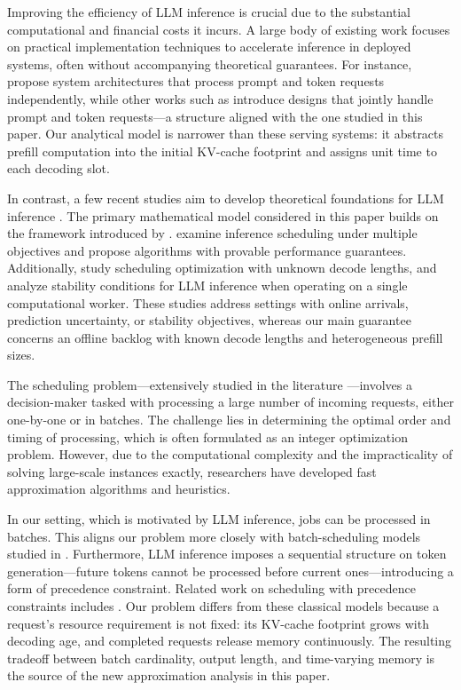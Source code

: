 \documentclass[nonblindrev]{informs3_hide}
\newcommand{\xhdr}[1]{\vspace{1mm} \noindent{\bf #1}}
\begin{document}
\xhdr{LLM Inference. } Improving the efficiency of LLM inference is crucial due to the substantial computational and financial costs it incurs. A large body of existing work focuses on practical implementation techniques to accelerate inference in deployed systems, often without accompanying theoretical guarantees. For instance, \citet{patel2023splitwise} propose system architectures that process prompt and token requests independently, while other works such as \citet{yu2022orca, agrawal2023sarathi, agrawal2024taming} introduce designs that jointly handle prompt and token requests---a structure aligned with the one studied in this paper. Our analytical model is narrower than these serving systems: it abstracts prefill computation into the initial KV-cache footprint and assigns unit time to each decoding slot.

In contrast, a few recent studies aim to develop theoretical foundations for LLM inference \cite{zhou2026position}. The primary mathematical model considered in this paper builds on the framework introduced by \citet{jaillet2025online}. \citet{ao2025optimizing} examine inference scheduling under multiple objectives and propose algorithms with provable performance guarantees. Additionally, \citet{chen2025adaptively,chen2026universal,bu2026tackling} study scheduling optimization with unknown decode lengths, and \citet{nie2026queueing} analyze stability conditions for LLM inference when operating on a single computational worker. These studies address settings with online arrivals, prediction uncertainty, or stability objectives, whereas our main guarantee concerns an offline backlog with known decode lengths and heterogeneous prefill sizes.

\xhdr{Scheduling. } The scheduling problem---extensively studied in the literature \citep{allahverdi2008survey, chen1998review, brucker1999resource, albers2009online}---involves a decision-maker tasked with processing a large number of incoming requests, either one-by-one or in batches. The challenge lies in determining the optimal order and timing of processing, which is often formulated as an integer optimization problem. However, due to the computational complexity and the impracticality of solving large-scale instances exactly, researchers have developed fast approximation algorithms and heuristics.

In our setting, which is motivated by LLM inference, jobs can be processed in batches. This aligns our problem more closely with batch-scheduling models studied in \citep{brucker1998scheduling, chen2008logistics, li2020online}. Furthermore, LLM inference imposes a sequential structure on token generation---future tokens cannot be processed before current ones---introducing a form of precedence constraint. Related work on scheduling with precedence constraints includes \citep{shahout2024don, schedPrecedence}. Our problem differs from these classical models because a request's resource requirement is not fixed: its KV-cache footprint grows with decoding age, and completed requests release memory continuously. The resulting tradeoff between batch cardinality, output length, and time-varying memory is the source of the new approximation analysis in this paper.
\end{document}
